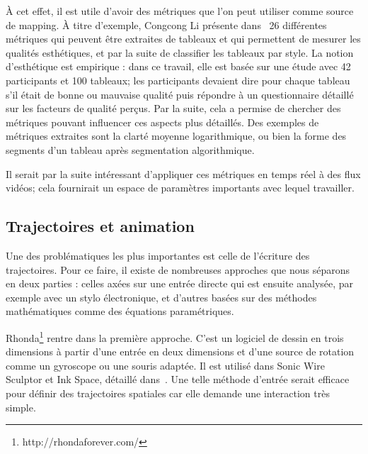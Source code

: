 \documentclass[french,12pt]{article}
\begin{document}
À cet effet, il est utile d'avoir des métriques que l'on peut utiliser comme source de mapping. À titre d'exemple, Congcong Li présente dans~\cite{li_aesthetic_2009} 26 différentes métriques qui peuvent être extraites de tableaux et qui permettent de mesurer les qualités esthétiques, et par la suite de classifier les tableaux par style. La notion d'esthétique est empirique : dans ce travail, elle est basée sur une étude avec 42 participants et 100 tableaux; les participants devaient dire pour chaque tableau s'il était de bonne ou mauvaise qualité puis répondre à un questionnaire détaillé sur les facteurs de qualité perçus. Par la suite, cela a permise de chercher des métriques pouvant influencer ces aspects plus détaillés.
Des exemples de métriques extraites sont la clarté moyenne logarithmique, ou bien la forme des segments d'un tableau après segmentation algorithmique.

Il serait par la suite intéressant d'appliquer ces métriques en temps réel à des flux vidéos; cela fournirait un espace de paramètres importants avec lequel travailler. 

\subsection{Trajectoires et animation}
Une des problématiques les plus importantes est celle de l'écriture des trajectoires. Pour ce faire, il existe de nombreuses approches que nous séparons en deux parties : celles axées sur une entrée directe qui est ensuite analysée, par exemple avec un stylo électronique, et d'autres basées sur des méthodes mathématiques comme des équations paramétriques.

Rhonda\footnote{http://rhondaforever.com/} rentre dans la première approche. C'est un logiciel de dessin en trois dimensions à partir d'une entrée en deux dimensions et d'une source de rotation comme un gyroscope ou une souris adaptée. Il est utilisé dans Sonic Wire Sculptor et Ink Space, détaillé dans~\cite{rasmuson_flying_2013}. Une telle méthode d'entrée serait efficace pour définir des trajectoires spatiales car elle demande une interaction très simple.
\end{document}
